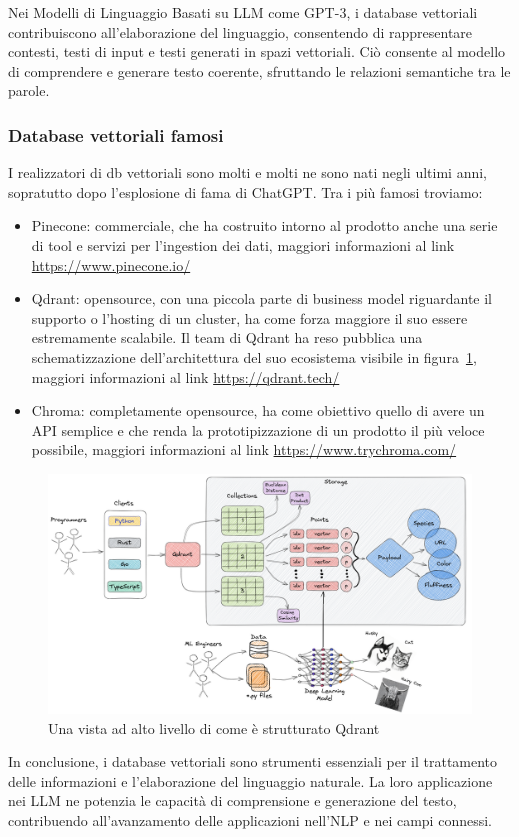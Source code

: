 Nei Modelli di Linguaggio Basati su LLM come GPT-3, i database vettoriali contribuiscono all'elaborazione del linguaggio, consentendo di rappresentare contesti, testi di input e testi generati in spazi vettoriali. Ciò consente al modello di comprendere e generare testo coerente, sfruttando le relazioni semantiche tra le parole.

\subsubsection{Database vettoriali famosi}

I realizzatori di db vettoriali sono molti e molti ne sono nati negli ultimi anni, sopratutto dopo l'esplosione di fama di ChatGPT. Tra i più famosi troviamo:
\begin{itemize}
    \item Pinecone: commerciale, che ha costruito intorno al prodotto anche una serie di tool e servizi per l'ingestion dei dati, maggiori informazioni al link \url{https://www.pinecone.io/}
    \item Qdrant: opensource, con una piccola parte di business model riguardante il supporto o l'hosting di un cluster, ha come forza maggiore il suo essere estremamente scalabile. Il team di Qdrant ha reso pubblica una schematizzazione dell'architettura del suo ecosistema visibile in figura~\ref{fig:qdrant_overview}, maggiori informazioni al link \url{https://qdrant.tech/}
    \item Chroma: completamente opensource, ha come obiettivo quello di avere un API semplice e che renda la prototipizzazione di un prodotto il più veloce possibile, maggiori informazioni al link \url{https://www.trychroma.com/}
\end{itemize}

\begin{center}
    \begin{figure}[H]
        \centering
        \includegraphics[width=0.7\pdfpagewidth]{images/qdrant_overview.png}
        \caption{Una vista ad alto livello di come è strutturato Qdrant}
        \label{fig:qdrant_overview}
    \end{figure}
\end{center}

In conclusione, i database vettoriali sono strumenti essenziali per il trattamento delle informazioni e l'elaborazione del linguaggio naturale. La loro applicazione nei LLM ne potenzia le capacità di comprensione e generazione del testo, contribuendo all'avanzamento delle applicazioni nell'NLP e nei campi connessi.